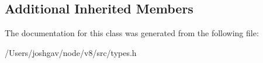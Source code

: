 \subsection*{Additional Inherited Members}


The documentation for this class was generated from the following file\+:\begin{DoxyCompactItemize}
\item 
/\+Users/joshgav/node/v8/src/types.\+h\end{DoxyCompactItemize}

